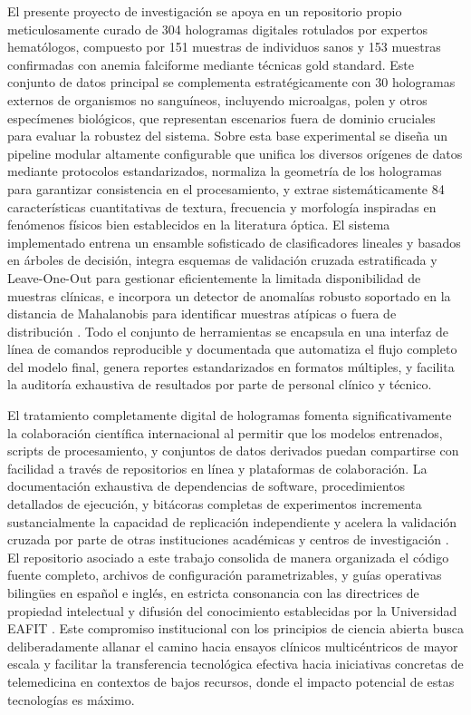 El presente proyecto de investigación se apoya en un repositorio propio meticulosamente curado de 304 hologramas digitales rotulados por expertos hematólogos, compuesto por 151 muestras de individuos sanos y 153 muestras confirmadas con anemia falciforme mediante técnicas gold standard. Este conjunto de datos principal se complementa estratégicamente con 30 hologramas externos de organismos no sanguíneos, incluyendo microalgas, polen y otros especímenes biológicos, que representan escenarios fuera de dominio cruciales para evaluar la robustez del sistema. Sobre esta base experimental se diseña un pipeline modular altamente configurable que unifica los diversos orígenes de datos mediante protocolos estandarizados, normaliza la geometría de los hologramas para garantizar consistencia en el procesamiento, y extrae sistemáticamente 84 características cuantitativas de textura, frecuencia y morfología inspiradas en fenómenos físicos bien establecidos en la literatura óptica. El sistema implementado entrena un ensamble sofisticado de clasificadores lineales y basados en árboles de decisión, integra esquemas de validación cruzada estratificada y Leave-One-Out para gestionar eficientemente la limitada disponibilidad de muestras clínicas, e incorpora un detector de anomalías robusto soportado en la distancia de Mahalanobis para identificar muestras atípicas o fuera de distribución \cite{Mahalanobis1936,Rousseeuw2019}. Todo el conjunto de herramientas se encapsula en una interfaz de línea de comandos reproducible y documentada que automatiza el flujo completo del modelo final, genera reportes estandarizados en formatos múltiples, y facilita la auditoría exhaustiva de resultados por parte de personal clínico y técnico.

El tratamiento completamente digital de hologramas fomenta significativamente la colaboración científica internacional al permitir que los modelos entrenados, scripts de procesamiento, y conjuntos de datos derivados puedan compartirse con facilidad a través de repositorios en línea y plataformas de colaboración. La documentación exhaustiva de dependencias de software, procedimientos detallados de ejecución, y bitácoras completas de experimentos incrementa sustancialmente la capacidad de replicación independiente y acelera la validación cruzada por parte de otras instituciones académicas y centros de investigación \cite{OConnor2020}. El repositorio asociado a este trabajo consolida de manera organizada el código fuente completo, archivos de configuración parametrizables, y guías operativas bilingües en español e inglés, en estricta consonancia con las directrices de propiedad intelectual y difusión del conocimiento establecidas por la Universidad EAFIT \cite{EAFIT2018}. Este compromiso institucional con los principios de ciencia abierta busca deliberadamente allanar el camino hacia ensayos clínicos multicéntricos de mayor escala y facilitar la transferencia tecnológica efectiva hacia iniciativas concretas de telemedicina en contextos de bajos recursos, donde el impacto potencial de estas tecnologías es máximo.

